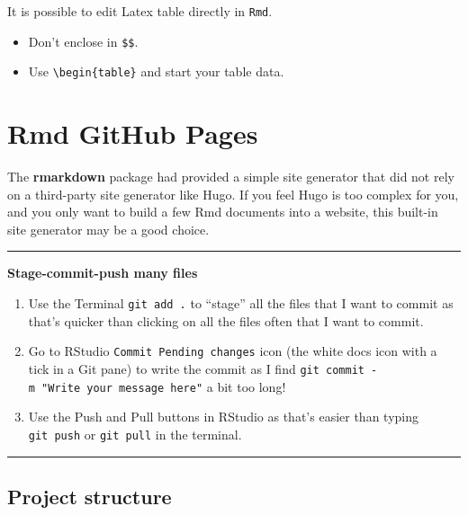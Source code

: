 \documentclass[
  a4paper,
  twoside,
  openright]{book}
\providecommand{\tightlist}{%
  \setlength{\itemsep}{0pt}\setlength{\parskip}{0pt}}
\theoremstyle{definition}
\theoremstyle{definition}
\theoremstyle{definition}
\theoremstyle{definition}
\theoremstyle{remark}
\begin{document}
It is possible to edit Latex table directly in \texttt{Rmd}.

\begin{itemize}
\tightlist
\item
  Don't enclose in \texttt{\$\$}.
\item
  Use \texttt{\textbackslash{}begin\{table\}} and start your table data.
\end{itemize}

\section{Rmd GitHub Pages}\label{rmd-github-pages}

The \textbf{rmarkdown} package had provided a simple site generator that did not rely on a third-party site generator like Hugo. If you feel Hugo is too complex for you, and you only want to build a few Rmd documents into a website, this built-in site generator may be a good choice.

\begin{center}\rule{0.5\linewidth}{0.5pt}\end{center}

\textbf{Stage-commit-push many files}

\begin{enumerate}
\def\labelenumi{\arabic{enumi}.}
\item
  Use the Terminal \texttt{git\ add\ .} to ``stage'' all the files that I want to commit as that's quicker than clicking on all the files often that I want to commit.
\item
  Go to RStudio \texttt{Commit\ Pending\ changes} icon (the white docs icon with a tick in a Git pane) to write the commit as I find \texttt{git\ commit\ -m\ "Write\ your\ message\ here"} a bit too long!
\item
  Use the Push and Pull buttons in RStudio as that's easier than typing \texttt{git\ push} or \texttt{git\ pull} in the terminal.
\end{enumerate}

\begin{center}\rule{0.5\linewidth}{0.5pt}\end{center}

\subsection*{Project structure}\label{project-structure}
\end{document}
